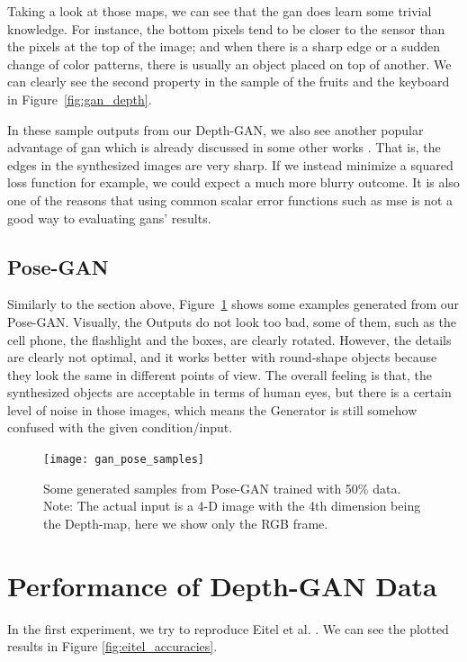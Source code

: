 Taking a look at those maps, we can see that the \acrshort{gan} does learn some trivial
knowledge. For instance, the bottom pixels tend to be closer to the sensor than the pixels
at the top of the image; and when there is a sharp edge or a sudden change of color
patterns, there is usually an object placed on top of another. We can clearly see the
second property in the sample of the fruits and the keyboard in Figure~\ref{fig:gan_depth}.

In these sample outputs from our Depth-GAN, we also see another popular advantage of
\acrshort{gan} which is already discussed in some other works \cite{gan, cogan, pix2pix}.
That is, the edges in the synthesized images are very sharp. If we instead minimize a
squared loss function for example, we could expect a much more blurry outcome. It is also
one of the reasons that using common scalar error functions such as \acrshort{mse} is not
a good way to evaluating \acrshort{gan}s' results.


\subsection{Pose-GAN}
\label{sub:pose_gan}

Similarly to the section above, Figure~\ref{fig:gan_pose_samples} shows some examples
generated from our Pose-GAN. Visually, the Outputs do not look too bad, some of them, such
as the cell phone, the flashlight and the boxes, are clearly rotated. However, the details
are clearly not optimal, and it works better with round-shape objects because they look
the same in different points of view. The overall feeling is that, the synthesized objects
are acceptable in terms of human eyes, but there is a certain level of noise in those
images, which means the Generator is still somehow confused with the given
condition/input.

\begin{figure}[h!]
	\centering
	\texttt{[image: gan\_pose\_samples]}
	\caption{Some generated samples from Pose-GAN trained with 50\% data. Note: The actual input is a 4-D image
	with the 4th dimension being the Depth-map, here we show only the RGB frame.}
	\label{fig:gan_pose_samples}
\end{figure}

\section{Performance of Depth-GAN Data}
In the first experiment, we try to reproduce Eitel et al. \cite{eitel}. We can
see the plotted results in Figure \ref{fig:eitel_accuracies}.

